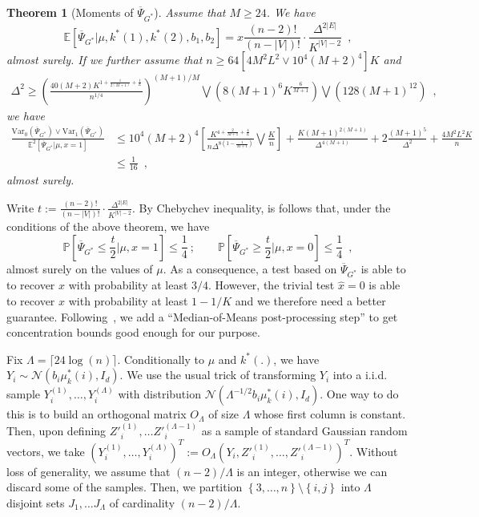 \documentclass{article}
\newcommand{\ac}[1]{\left\{#1\right\}}
\newtheorem{theorem}{Theorem}
\begin{document}
\begin{theorem}[Moments of $\overline{\Psi}_{G^*}$]\label{thm:moment:rappeur}
    Assume that $M\geq 24$. 
We have 
\[
            \mathbb{E}\left[\overline{\Psi}_{G^*}|\mu, k^*(1),k^*(2), b_1,b_2 \right]= x\frac{(n-2)!}{(n-|V|)!} \cdot \frac{\Delta^{2|E|}}{K^{|V|-2}} \enspace , %
\] 
almost surely. 
If we further assume that $n\geq 64[4M^2L^2\vee 10^4 (M+2)^4] K$ and 
\begin{eqnarray}\label{eq:condition:signa}
\Delta^2 \geq \left(\frac{40 (M+2) K^{1+\frac{1}{2(M+1)}+\tfrac{1}{L}}}{n^{1/4}}\right)^{(M+1)/M} \bigvee \left(8(M+1)^6 K^{\tfrac{6}{M+1}}\right)\bigvee \left(128(M+1)^{12}\right)\enspace ,
\end{eqnarray}
  we have
\begin{align*}
\frac{\mathrm{Var}_0(\overline{\Psi}_{G^*})\vee \mathrm{Var}_1(\overline{\Psi}_{G^*})}{\mathbb E^2[\overline{\Psi}_{G^*}|\mu,x=1] }&\leq 10^4(M+2)^4   \left[\frac{K^{4+\tfrac{2}{M+1}+\tfrac{4}{L} }}{n\Delta^{8(1-\tfrac{1}{M+1})}}\bigvee \frac{K}{n}\right]+ \frac{K(M+1)^{2(M+1)}}{\Delta^{4(M+1)}} + 2  \frac{(M+1)^{5}}{\Delta^{2}}  +  \frac{4M^2L   ^2K}{n}\\&\leq \frac{1}{16}\enspace , 
\end{align*}
almost surely.
\end{theorem}

Write $t := \frac{(n-2)!}{(n-|V|)!} \cdot \frac{\Delta^{2|E|}}{K^{|V|-2}}$. By Chebychev inequality, is follows that, under the conditions of the above theorem, we have  
\[
\mathbb{P}\left[\overline{\Psi}_{G^*}\leq \frac{t}{2}\Big|\mu, x=1 \right]\leq \frac{1}{4}  \ ; \quad\quad\mathbb{P}\left[\overline{\Psi}_{G^*}\geq \frac{t}{2}\Big|\mu, x=0 \right]\leq \frac{1}{4}  \enspace ,  
\]
almost surely on the values of $\mu$. As a consequence, a test based on $\overline{\Psi}_{G^*}$ is able to to recover $x$ with probability at least $3/4$. However, the trivial test $\hat{x}=0$ is able to recover $x$ with probability at least $1-1/K$ and we therefore need a better guarantee.  Following~\cite{carpentier2025phase}, we add a ``Median-of-Means post-processing step'' to get  concentration bounds good enough for our purpose.


Fix $\Lambda=\lceil 24\log(n)\rceil$. Conditionally to $\mu$ and $k^*(.)$, we have $Y_i\sim \mathcal{N}(b_i\mu_k^*(i), I_d)$. We use the usual trick of  transforming $Y_i$ into a i.i.d. sample $Y_i^{(1)},\ldots, Y_i^{(\Lambda)}$ with distribution  $\mathcal{N}( \Lambda^{-1/2}b_i\mu_k^*(i), I_d)$. One way to do this is to build an orthogonal matrix $O_{\Lambda}$ of size $\Lambda$ whose first column is constant. Then, upon defining $Z'^{(1)}_{i},\ldots Z'^{(\Lambda-1)}_{i}$ as a sample of standard Gaussian random vectors, we take  $(Y_i^{(1)},\ldots, Y_i^{(\Lambda)})^T := O_{\Lambda}(Y_i,Z'^{(1)}_{i},\ldots, Z'^{(\Lambda-1)}_{i} )^T$.  Without loss of generality, we assume that $(n-2)/\Lambda$ is an integer, otherwise we can discard some of the samples.  Then, we partition $\ac{3,\ldots,n}\setminus\ac{i,j}$ into $\Lambda$ disjoint sets $J_1,\ldots J_{\Lambda}$ of cardinality $ (n-2)/\Lambda$.
\end{document}
